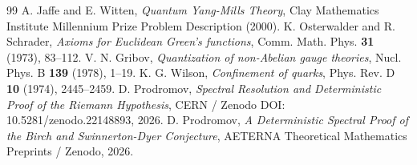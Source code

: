 \documentclass[11pt,reqno]{amsart}
\theoremstyle{plain}
\theoremstyle{definition}
\theoremstyle{remark}
\numberwithin{equation}{section}
\begin{document}
\begin{thebibliography}{99}
 A. Jaffe and E. Witten, \emph{Quantum Yang-Mills Theory}, Clay Mathematics Institute Millennium Prize Problem Description (2000).
 K. Osterwalder and R. Schrader, \emph{Axioms for Euclidean Green's functions}, Comm. Math. Phys. \textbf{31} (1973), 83--112.
 V. N. Gribov, \emph{Quantization of non-Abelian gauge theories}, Nucl. Phys. B \textbf{139} (1978), 1--19.
 K. G. Wilson, \emph{Confinement of quarks}, Phys. Rev. D \textbf{10} (1974), 2445--2459.
 D. Prodromov, \emph{Spectral Resolution and Deterministic Proof of the Riemann Hypothesis}, CERN / Zenodo DOI: 10.5281/zenodo.22148893, 2026.
 D. Prodromov, \emph{A Deterministic Spectral Proof of the Birch and Swinnerton-Dyer Conjecture}, AETERNA Theoretical Mathematics Preprints / Zenodo, 2026.
\end{thebibliography}
\end{document}
